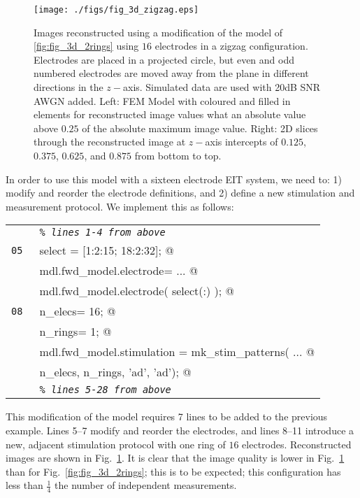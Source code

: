 \documentclass[12pt]{iopart}
\makeatletter
\newcommand{\CODEstart}{\medskip\begin{tabular}{ll}}
\newcommand{\CN}{\tt\scriptsize} %
\newcommand{\CC}{&\small\verb@}   % start code
\newcommand{\CI}{&\small\tt\em}   % start code
\newcommand{\CODEend}{\end{tabular}\medskip}
\makeatother
\begin{document}
%
% FIGURE: Zigzag electrode config
%
\begin{figure}[th]
\begin{flushright}
\texttt{[image: ./figs/fig\_3d\_zigzag.eps]}
\caption{\small
Images reconstructed using a modification of
the model of \ref{fig:fig_3d_2rings} using $16$
electrodes in a zigzag configuration. Electrodes are placed
in a projected circle, but even and odd numbered electrodes
are moved away from the plane in different directions in the
$z-$axis.
Simulated data
are used with 20dB SNR AWGN added.
Left: FEM Model with coloured and filled in elements for
reconstructed image values what an absolute value
above $0.25$ of the absolute maximum image value.
Right: 2D slices through the reconstructed image at
$z-$axis intercepts of $0.125$, $0.375$, $0.625$, and $0.875$
from bottom to top.
 \label{fig:fig_3d_zigzag}
}
\end{flushright}
\end{figure}

In order to use this model with a sixteen electrode EIT
system, we need to: 1) modify and reorder the electrode
definitions, and 2) define a new stimulation and measurement
protocol. We implement this as follows:

\CODEstart
\CN    \CI \% lines 1-4 from above \\[-3pt]
\CN 05 \CC select = [1:2:15; 18:2:32]; @\\[-3pt]
\CN    \CC mdl.fwd_model.electrode=  ... @\\[-3pt]
\CN    \CC     mdl.fwd_model.electrode( select(:) ); @\\[-3pt]
\CN 08 \CC n_elecs= 16; @\\[-3pt]
\CN    \CC n_rings= 1; @\\[-3pt]
\CN    \CC mdl.fwd_model.stimulation = mk_stim_patterns( ... @\\[-3pt]
\CN    \CC              n_elecs, n_rings, '{ad}', '{ad}'); @\\[-3pt]
\CN    \CI \% lines 5-28 from above \\[-3pt]
\CODEend

This modification of the model requires 7 lines to be added
to the previous example. Lines 5--7 modify and reorder the
electrodes, and lines 8--11 introduce a new, adjacent
stimulation protocol with one ring of $16$ electrodes. Reconstructed
images are shown in Fig.~\ref{fig:fig_3d_zigzag}.
It is clear that the image quality is lower in Fig.~\ref{fig:fig_3d_zigzag}
than for Fig.~\ref{fig:fig_3d_2rings}; this is to be expected;
this configuration
has less than $\frac{1}{4}$ the number of independent measurements.
 
\end{document}
